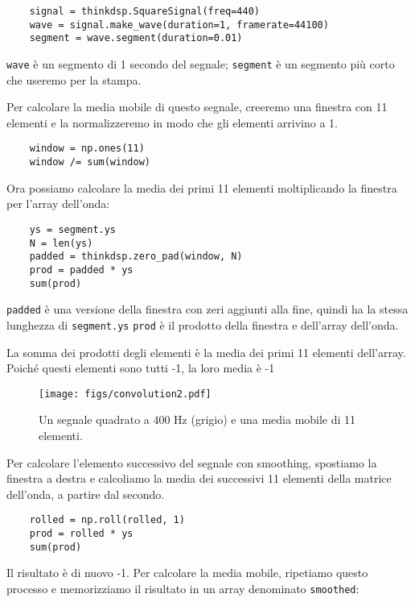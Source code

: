 \documentclass[12pt,a4paper]{book}
\begin{document}
\begin{verbatim} 
    signal = thinkdsp.SquareSignal(freq=440)
    wave = signal.make_wave(duration=1, framerate=44100)
    segment = wave.segment(duration=0.01)
 \end{verbatim} 

{\tt wave} è un segmento di 1 secondo del segnale; {\tt segment} è un segmento più corto che useremo per la stampa.

Per calcolare la media mobile di questo segnale, creeremo una finestra con 11 elementi e la normalizzeremo in modo che gli elementi arrivino a 1.

\begin{verbatim} 
    window = np.ones(11)
    window /= sum(window)
 \end{verbatim} 

Ora possiamo calcolare la media dei primi 11 elementi moltiplicando la finestra per l'array dell'onda:

\begin{verbatim} 
    ys = segment.ys
    N = len(ys)
    padded = thinkdsp.zero_pad(window, N)
    prod = padded * ys
    sum(prod)
 \end{verbatim} 

{\tt padded} è una versione della finestra con zeri aggiunti alla fine, quindi ha la stessa lunghezza di {\tt segment.ys} {\tt prod} è il prodotto della finestra e dell'array dell'onda.

La somma dei prodotti degli elementi è la media dei primi 11 elementi dell'array. Poiché questi elementi sono tutti -1, la loro media è -1

\begin{figure} 

\centerline{\texttt{[image: figs/convolution2.pdf]}} \caption{Un segnale quadrato a 400 Hz (grigio) e una media mobile di 11 elementi.} \label{fig.convolution2} \end{figure} 

Per calcolare l'elemento successivo del segnale con smoothing, spostiamo la finestra a destra e calcoliamo la media dei successivi 11 elementi della matrice dell'onda, a partire dal secondo.

\begin{verbatim} 
    rolled = np.roll(rolled, 1)
    prod = rolled * ys
    sum(prod)
 \end{verbatim} 

Il risultato è di nuovo -1. Per calcolare la media mobile, ripetiamo questo processo e memorizziamo il risultato in un array denominato {\tt smoothed}:
\end{document}
